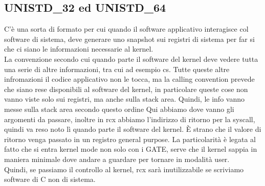 \documentclass[12pt, oneside]{extbook}
\begin{document}
\subsection{UNISTD\_32 ed UNISTD\_64}
C'è una sorta di formato per cui quando il software applicativo interagisce col software di sistema, deve generare uno snapshot sui registri di sistema per far si che ci siano le informazioni necessarie al kernel.\\ La convenzione secondo cui quando parte il software del kernel deve vedere tutta una serie di altre informazioni, tra cui ad esempio cs. Tutte queste altre infromazioni il codice applicativo non le tocca, ma la calling convention prevede che siano rese disponibili al software del kernel, in particolare queste cose non vanno viste solo sui registri, ma anche sulla stack area. Quindi, le info vanno messe sulla stack area secondo questo ordine
Qui abbiamo dove vanno gli argomenti da passare, inoltre in rcx abbiamo l'indirizzo di ritorno per la syscall, quindi va reso noto lì quando parte il software del kernel. È strano che il valore di ritorno venga passato in un registro general purpose. La particolarità è legata al fatto che si entra kernel mode non solo con i GATE, serve che il kernel sappia in maniera minimale dove andare a guardare per tornare in modalità user.\\ Quindi, se passiamo il controllo al kernel, rcx sarà inutilizzabile se scriviamo software di C non di sistema.
\end{document}
